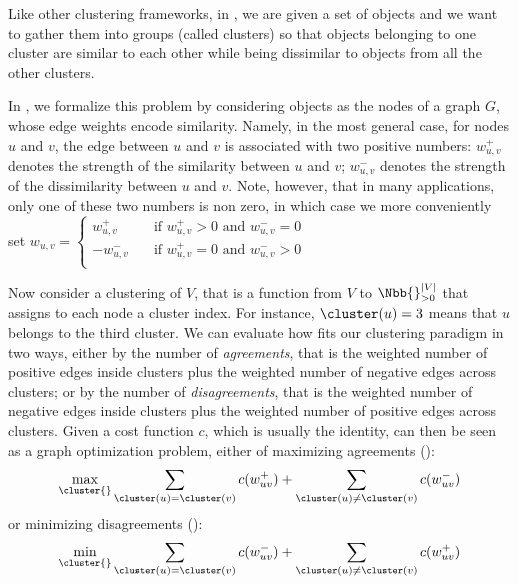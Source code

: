 Like other clustering frameworks, in \pcc{}, we are given a set of objects and we want to gather
them into groups (called clusters) so that objects belonging to one cluster are similar to each
other while being dissimilar to objects from all the other clusters.

In \pcc{}, we formalize this problem by considering objects as the nodes of a graph $G$, whose edge
weights encode similarity. Namely, in the most general case, for nodes $u$ and $v$, the edge between
$u$ and $v$ is associated with two positive numbers:
$w_{u,v}^+$ denotes the strength of the similarity between $u$ and $v$;
$w_{u,v}^-$ denotes the strength of the dissimilarity between $u$ and $v$.
Note, however, that in many applications, only one of these two numbers is non zero, in which case
we more conveniently set $w_{u,v} = \begin{cases}
	 w_{u,v}^+ & \quad \text{if } w_{u,v}^+ > 0 \text{ and } w_{u,v}^-=0 \\
	-w_{u,v}^- & \quad \text{if } w_{u,v}^+ = 0 \text{ and } w_{u,v}^->0 \\
\end{cases}$

Now consider a clustering \cluster{} of $V$, that is a function from $V$ to $\Nbb{}^{|V|}_{>0}$
that assigns to each node a cluster index. For instance, $\cluster(u) = 3$ means that $u$ belongs
to the third cluster. We can evaluate how \cluster{} fits our clustering paradigm in two ways,
either by the number of \emph{agreements}, that is the weighted number of positive edges inside
clusters plus the weighted number of negative edges across clusters; or by the number of
\emph{disagreements}, that is the weighted number of negative edges inside clusters plus the
weighted number of positive edges across clusters. Given a cost function $c$, which is usually the
identity, \pcc{} can then be seen as a graph optimization problem, either of maximizing agreements
(\maxa{}):
\begin{equation}
	\max_{\cluster{}} \sum_{\cluster(u) = \cluster(v)} c(w_{uv}^+) +
	\sum_{\cluster(u) \neq \cluster(v)} c(w_{uv}^-)
	\label{eq:maxa}
\end{equation}
or minimizing disagreements (\mind{}):
\begin{equation}
	\min_{\cluster{}} \sum_{\cluster(u) = \cluster(v)} c(w_{uv}^-) +
	\sum_{\cluster(u) \neq \cluster(v)} c(w_{uv}^+)
	\label{eq:mind}
\end{equation}

